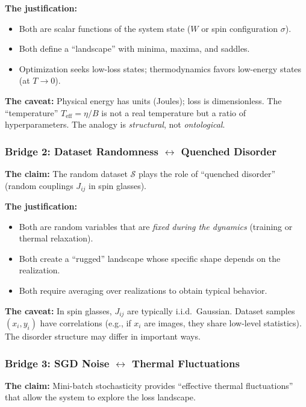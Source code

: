 \documentclass[
  journal=largetwo,
  simfonts=false,
  year=2025,
  volume=37,
]{cup-journal}
\begin{document}
\textbf{The justification:}
\begin{itemize}
    \item Both are scalar functions of the system state ($W$ or spin configuration $\sigma$).
    \item Both define a ``landscape'' with minima, maxima, and saddles.
    \item Optimization seeks low-loss states; thermodynamics favors low-energy states (at $T \to 0$).
\end{itemize}

\textbf{The caveat:} Physical energy has units (Joules); loss is dimensionless. The ``temperature'' $T_{\text{eff}} = \eta/B$ is not a real temperature but a ratio of hyperparameters. The analogy is \textit{structural}, not \textit{ontological}.

\subsubsection{Bridge 2: Dataset Randomness \texorpdfstring{$\leftrightarrow$}{<->} Quenched Disorder}

\textbf{The claim:} The random dataset $\mathcal{S}$ plays the role of ``quenched disorder'' (random couplings $J_{ij}$ in spin glasses).

\textbf{The justification:}
\begin{itemize}
    \item Both are random variables that are \textit{fixed during the dynamics} (training or thermal relaxation).
    \item Both create a ``rugged'' landscape whose specific shape depends on the realization.
    \item Both require averaging over realizations to obtain typical behavior.
\end{itemize}

\textbf{The caveat:} In spin glasses, $J_{ij}$ are typically i.i.d.\ Gaussian. Dataset samples $(x_i, y_i)$ have correlations (e.g., if $x_i$ are images, they share low-level statistics). The disorder structure may differ in important ways.

\subsubsection{Bridge 3: SGD Noise \texorpdfstring{$\leftrightarrow$}{<->} Thermal Fluctuations}

\textbf{The claim:} Mini-batch stochasticity provides ``effective thermal fluctuations'' that allow the system to explore the loss landscape.
\end{document}
